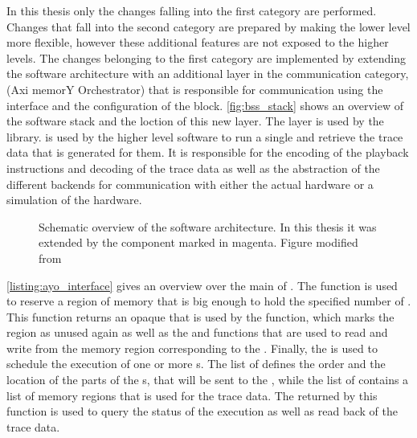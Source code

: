 In this thesis only the changes falling into the first category are performed. Changes that fall into the second category are prepared by making the lower level \API{} more flexible, however these additional features are not exposed to the higher levels. The changes belonging to the first category are implemented by extending the \BSSTwo{} software architecture with an additional layer in the communication category, \ayo{} (Axi memorY Orchestrator) that is responsible for communication using the \FAXI{} interface and the configuration of the \AXIDMA{} block. \autoref{fig:bss_stack} shows an overview of the software stack and the loction of this new \ayo{} layer. The \ayo{} layer is used by the \hxcomm{} library. \hxcomm{} is used by the higher level software to run a single \PlaybackProgram{} and retrieve the trace data that is generated for them. It is responsible for the \UT{} encoding of the playback instructions and \UT{} decoding of the trace data as well as the abstraction of the different backends for communication with either the actual hardware or a simulation of the hardware.

\begin{figure}[htbp]
\centerline{}
\caption{Schematic overview of the \BSSTwo{} software architecture. In this thesis it was extended by the \ayo{} component marked in magenta. Figure modified from \autocite{mueller2022scalable}}\label{fig:bss_stack}
\end{figure}

\autoref{listing:ayo_interface} gives an overview over the main \API{} of \ayo{}. The  function is used to reserve a region of memory that is big enough to hold the specified number of . This function returns an opaque  that is used by the  function, which marks the region as unused again as well as the  and  functions that are used to read and write from the memory region corresponding to the .
Finally, the  is used to schedule the execution of one or more \PlaybackProgram{}s. The list of  defines the order and the location of the parts of the \PlaybackProgram{}s, that will be sent to the \pbexec{}, while the list of  contains a list of memory regions that is used for the trace data. The  returned by this function is used to query the status of the execution as well as read back of the trace data.

